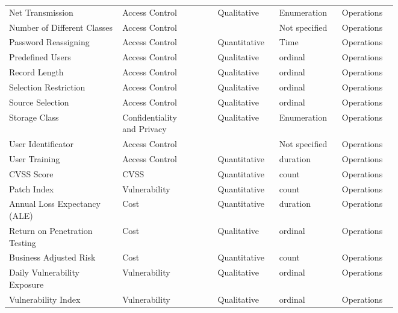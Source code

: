 \begin{tiny}
\begin{longtable}{@{}p{0.25\linewidth}p{0.15\linewidth}p{0.05\linewidth}p{0.1\linewidth}p{0.1\linewidth}p{0.1\linewidth}@{}}
Net Transmission & Access Control  & \cite{Villarrubia_Fernandez-Medina_Piattini_2006} & Qualitative & Enumeration & Operations \\
Number of Different Classes & Access Control  & \cite{Villarrubia_Fernandez-Medina_Piattini_2006} &  & Not specified & Operations \\
Password Reassigning & Access Control  & \cite{Villarrubia_Fernandez-Medina_Piattini_2006} & Quantitative & Time & Operations \\
Predefined Users & Access Control  & \cite{Villarrubia_Fernandez-Medina_Piattini_2006} & Qualitative & ordinal & Operations \\
Record Length & Access Control  & \cite{Villarrubia_Fernandez-Medina_Piattini_2006} & Qualitative & ordinal & Operations \\
Selection Restriction & Access Control  & \cite{Villarrubia_Fernandez-Medina_Piattini_2006} & Qualitative & ordinal & Operations \\
Source Selection & Access Control  & \cite{Villarrubia_Fernandez-Medina_Piattini_2006} & Qualitative & ordinal & Operations \\
Storage Class & Confidentiality and Privacy  & \cite{Villarrubia_Fernandez-Medina_Piattini_2006} & Qualitative & Enumeration & Operations \\
User Identificator & Access Control  & \cite{Villarrubia_Fernandez-Medina_Piattini_2006} &  & Not specified & Operations \\
User Training & Access Control  & \cite{Villarrubia_Fernandez-Medina_Piattini_2006} & Quantitative & duration & Operations \\
CVSS Score & CVSS  & \cite{Schryen_Kadura_2009} & Quantitative & count & Operations \\
Patch Index & Vulnerability  & \cite{Schryen_Kadura_2009} & Quantitative & count & Operations \\
Annual Loss Expectancy (ALE) & Cost  & \cite{Bohme_Felegyhazi_2010} & Quantitative & duration & Operations \\
Return on Penetration Testing & Cost  & \cite{Bohme_Felegyhazi_2010} & Qualitative & ordinal & Operations \\
Business Adjusted Risk & Cost  & \cite{Trcek_2010} & Quantitative & count & Operations \\
Daily Vulnerability Exposure & Vulnerability  & \cite{Trcek_2010} & Qualitative & ordinal & Operations \\
Vulnerability Index & Vulnerability  & \cite{Trcek_2010} & Qualitative & ordinal & Operations \\

\end{longtable}
\end{tiny}

